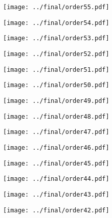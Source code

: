 \documentclass{article}
\begin{document}
\begin{figure}[H]
    \centering
    \texttt{[image: ../final/order55.pdf]}
\end{figure}
\begin{figure}[H]
    \centering
    \texttt{[image: ../final/order54.pdf]}
\end{figure}
\begin{figure}[H]
    \centering
    \texttt{[image: ../final/order53.pdf]}
\end{figure}
\begin{figure}[H]
    \centering
    \texttt{[image: ../final/order52.pdf]}
\end{figure}
\begin{figure}[H]
    \centering
    \texttt{[image: ../final/order51.pdf]}
\end{figure}
\begin{figure}[H]
    \centering
    \texttt{[image: ../final/order50.pdf]}
\end{figure}
\begin{figure}[H]
    \centering
    \texttt{[image: ../final/order49.pdf]}
\end{figure}
\begin{figure}[H]
    \centering
    \texttt{[image: ../final/order48.pdf]}
\end{figure}
\begin{figure}[H]
    \centering
    \texttt{[image: ../final/order47.pdf]}
\end{figure}
\begin{figure}[H]
    \centering
    \texttt{[image: ../final/order46.pdf]}
\end{figure}
\begin{figure}[H]
    \centering
    \texttt{[image: ../final/order45.pdf]}
\end{figure}
\begin{figure}[H]
    \centering
    \texttt{[image: ../final/order44.pdf]}
\end{figure}
\begin{figure}[H]
    \centering
    \texttt{[image: ../final/order43.pdf]}
\end{figure}
\begin{figure}[H]
    \centering
    \texttt{[image: ../final/order42.pdf]}
\end{figure}
\end{document}
